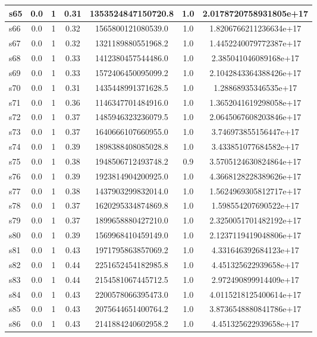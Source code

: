 \documentclass{article}
\begin{document}
\begin{tabular}{|l|c|c|c|c|c|c|}
\hline
s65 &0.0 & 1 & 0.31 & 1353524847150720.8 & 1.0 & 2.0178720758931805e+17\\
\hline
s66 &0.0 & 1 & 0.32 & 1565800121080539.0 & 1.0 & 1.8206766211236634e+17\\
\hline
s67 &0.0 & 1 & 0.32 & 1321189880551968.2 & 1.0 & 1.4452240079772387e+17\\
\hline
s68 &0.0 & 1 & 0.33 & 1412380457544486.0 & 1.0 & 2.385041046089168e+17\\
\hline
s69 &0.0 & 1 & 0.33 & 1572406450095099.2 & 1.0 & 2.1042843364388426e+17\\
\hline
s70 &0.0 & 1 & 0.31 & 1435448991371628.5 & 1.0 & 1.28868935346535e+17\\
\hline
s71 &0.0 & 1 & 0.36 & 1146347701484916.0 & 1.0 & 1.3652041619298058e+17\\
\hline
s72 &0.0 & 1 & 0.37 & 1485946323236079.5 & 1.0 & 2.0645067608203846e+17\\
\hline
s73 &0.0 & 1 & 0.37 & 1640666107660955.0 & 1.0 & 3.746973855156447e+17\\
\hline
s74 &0.0 & 1 & 0.39 & 1898388408085028.8 & 1.0 & 3.433851077684582e+17\\
\hline
s75 &0.0 & 1 & 0.38 & 1948506712493748.2 & 0.9 & 3.5705124630824864e+17\\
\hline
s76 &0.0 & 1 & 0.39 & 1923814904200925.0 & 1.0 & 4.3668128228389626e+17\\
\hline
s77 &0.0 & 1 & 0.38 & 1437903299832014.0 & 1.0 & 1.5624969305812717e+17\\
\hline
s78 &0.0 & 1 & 0.37 & 1620295334874869.8 & 1.0 & 1.598554207690522e+17\\
\hline
s79 &0.0 & 1 & 0.37 & 1899658880427210.0 & 1.0 & 2.3250051701482192e+17\\
\hline
s80 &0.0 & 1 & 0.39 & 1569968410459149.0 & 1.0 & 2.1237119419048806e+17\\
\hline
s81 &0.0 & 1 & 0.43 & 1971795863857069.2 & 1.0 & 4.331646392684123e+17\\
\hline
s82 &0.0 & 1 & 0.44 & 2251652454182985.8 & 1.0 & 4.451325622939658e+17\\
\hline
s83 &0.0 & 1 & 0.44 & 2154581067445712.5 & 1.0 & 2.972490899914409e+17\\
\hline
s84 &0.0 & 1 & 0.43 & 2200578066395473.0 & 1.0 & 4.0115218125400614e+17\\
\hline
s85 &0.0 & 1 & 0.43 & 2075644651400764.2 & 1.0 & 3.8736548880841786e+17\\
\hline
s86 &0.0 & 1 & 0.43 & 2141884240602958.2 & 1.0 & 4.451325622939658e+17\\

\end{tabular}
\end{document}

